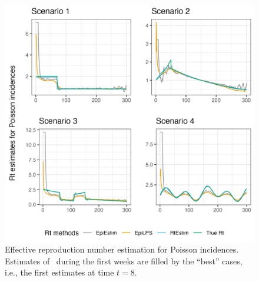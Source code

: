 \begin{figure}[tb]
    \centering
    \includegraphics*[width=140mm]{fig/Pois-res-plot.png}
    \caption{Effective reproduction number estimation for Poisson incidences. Estimates of \EpiEstim\ during the first weeks are filled by the ``best'' cases, i.e., the first estimates at time $t=8$.}
    \label{fig:pois-est}
\end{figure}


